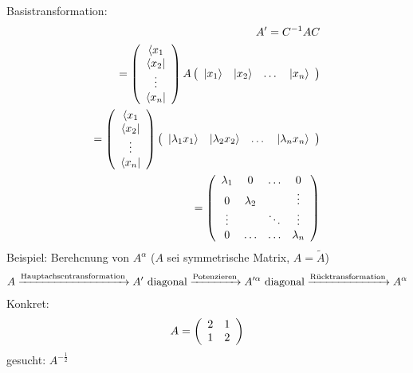 \documentclass{article}
\begin{document}
Basistransformation:\begin{eqnarray*}
    A' = C^{-1}AC\\
    =\left(\begin{array}{c}
        \langle x_1\\
        \langle x_2|\\
        \vdots\\
        \langle x_n|
    \end{array}\right) A \left(\begin{array}{c c c c}
        |x_1\rangle&|x_2\rangle&\dots&|x_n\rangle
    \end{array}\right)\\
    = \left(\begin{array}{c}
        \langle x_1\\
        \langle x_2|\\
        \vdots\\
        \langle x_n|
    \end{array}\right)\left(\begin{array}{c c c c}
        |\lambda_1 x_1\rangle&|\lambda_2 x_2\rangle&\dots&|\lambda_n x_n\rangle
    \end{array}\right)\\
    = \left(\begin{array}{c c c c}
        \lambda_1&0&\hdots&0\\
        0&\lambda_2&&\vdots \\
        \vdots&&\ddots&\vdots\\
        0&\hdots&\hdots&\lambda_n
    \end{array}\right)
\end{eqnarray*}
Beispiel: Berehcnung von $A^\alpha$ ($A$ sei symmetrische Matrix, $A = \tilde{A}$)\\
\begin{eqnarray*}
    A\ce{->[Hauptachsentransformation]}A' \text{ diagonal} \ce{->[Potenzieren]} A'^\alpha \text{ diagonal} \ce{->[R\text{ü}cktransformation]} A^\alpha
\end{eqnarray*}
Konkret: \begin{eqnarray*}
    A = \left(\begin{array}{c c}
        2&1\\1&2
    \end{array}\right)
\end{eqnarray*}
gesucht: $A^{-\frac{1}{2}}$\\
\end{document}
